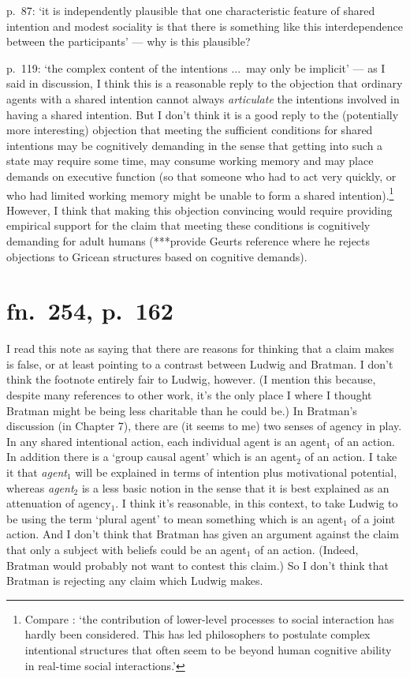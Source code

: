 \documentclass[12pt,letterpaper]{extarticle}
\begin{document}
p.\ 87: `it is independently plausible that one characteristic feature of shared intention and modest sociality is that there is something like this interdependence between the participants' --- why is this plausible?  

p.\ 119: `the complex content of the intentions ...\ may only be implicit' --- as I said in discussion, I think this is a reasonable reply to the objection that ordinary agents with a shared intention cannot always \emph{articulate} the intentions involved in having a shared intention.  
But I don't think it is a good reply to the (potentially more interesting) objection that meeting the sufficient conditions for shared intentions may be cognitively demanding in the sense that  getting into such a state may require some time, may consume working memory and may place demands on executive function (so that someone who had to act very quickly, or who had limited working memory might be unable to form a shared intention).\footnote{
Compare \citet[p.\ 2022]{Knoblich:2008hy}: `the contribution of lower-level processes to social interaction has hardly been considered. This has led philosophers to postulate complex intentional structures that often seem to be beyond human cognitive ability in real-time social interactions.'
} 
However, I think that making this objection convincing would require providing empirical support for the claim that meeting these conditions is cognitively demanding for  adult humans 
 (***provide Geurts reference where he rejects objections to Gricean structures based on cognitive demands).



\section{fn.\ 254, p.\ 162}
I read this note as saying that there are reasons for thinking that a claim \citet{ludwig_collective_2007} makes is false, or at least pointing to a contrast between Ludwig and Bratman.
I don't think the footnote entirely fair to Ludwig, however.
(I mention this because, despite many references to other work, it's the only place I where I thought Bratman might be being less charitable than he could be.)
In Bratman's discussion (in Chapter 7), there are (it seems to me) two senses of agency in play.
In any shared intentional action, each individual agent is an agent$_1$ of an action.
In addition there is a `group causal agent' which is an agent$_2$ of an action.
I take it that \emph{agent$_1$} will be explained in terms of intention plus motivational potential, whereas \emph{agent$_2$} is a less basic notion in the sense that it is best explained as an attenuation of agency$_1$.
I think it's reasonable, in this context, to take Ludwig to be using the term `plural agent' to mean something which is an agent$_1$ of a joint action.
And I don't think that Bratman has given an argument against the claim that only a subject with beliefs could be an agent$_1$ of an action.
(Indeed, Bratman would probably not want to contest this claim.)
So I don't think that Bratman is rejecting any claim which Ludwig makes.
\end{document}
